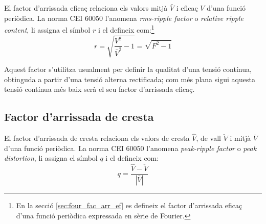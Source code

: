 El factor d'arrissada eficaç relaciona els
valors mitjà $\bar{V}$ i eficaç $V$ d'una funció periòdica.
La norma CEI 60050 l'anomena \textit{rms-ripple factor} o \textit{relative ripple content}, li assigna el símbol $r$ i el defineix com:\footnote{En la secció \ref{sec:four_fac_arr_ef} es defineix el factor d'arrissada eficaç d'una funció periòdica expressada en sèrie de Fourier.}
\begin{equation}
    r = \sqrt{\frac{V^2}{\bar{V}^2}-1} = \sqrt{F^2-1}\label{eq:rms_rip}
\end{equation}

Aquest factor s'utilitza usualment per definir la qualitat d'una
tensió contínua, obtinguda a partir  d'una tensió alterna rectificada; com més
plana sigui aquesta tensió contínua més baix serà el seu factor
d'arrissada eficaç.

\subsection{Factor d'arrissada de cresta}

El factor d'arrissada de cresta relaciona els valors de cresta $\hat{V}$, de vall $\check{V}$  i mitjà $\bar{V}$
 d'una funció periòdica. La norma CEI 60050 l'anomena \textit{peak-ripple factor} o \textit{peak distortion}, li assigna el símbol $q$ i el defineix com:
\begin{equation}
    q = \frac{\hat{V} - \check{V}}{|\bar{V}|}
\end{equation}


